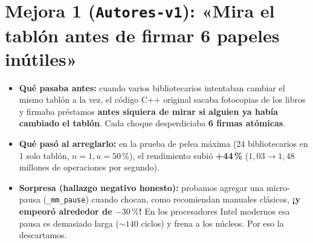 \documentclass[11pt,a4paper]{article}
\begin{document}
\section*{Mejora 1 (\texttt{Autores-v1}): «Mira el tablón antes de firmar 6 papeles inútiles»}
\begin{itemize}
  \item \textbf{Qué pasaba antes:} cuando varios bibliotecarios intentaban cambiar el mismo tablón a la vez, el código C++ original sacaba fotocopias de los libros y firmaba préstamos \textbf{antes siquiera de mirar si alguien ya había cambiado el tablón}. Cada choque desperdiciaba \textbf{6 firmas atómicas}.
  \item \textbf{Qué pasó al arreglarlo:} en la prueba de pelea máxima (24 bibliotecarios en 1 solo tablón, $n = 1, u = 50\,\%$), el rendimiento subió \textbf{+44\,\%} ($1{,}03 \to 1{,}48$ millones de operaciones por segundo).
  \item \textbf{Sorpresa (hallazgo negativo honesto):} probamos agregar una micro-pausa (\texttt{\_mm\_pause}) cuando chocan, como recomiendan manuales clásicos, \textbf{¡y empeoró alrededor de $-30\,\%$!} En los procesadores Intel modernos esa pausa es demasiado larga ($\sim 140$ ciclos) y frena a los núcleos. Por eso la descartamos.
\end{itemize}
\end{document}
